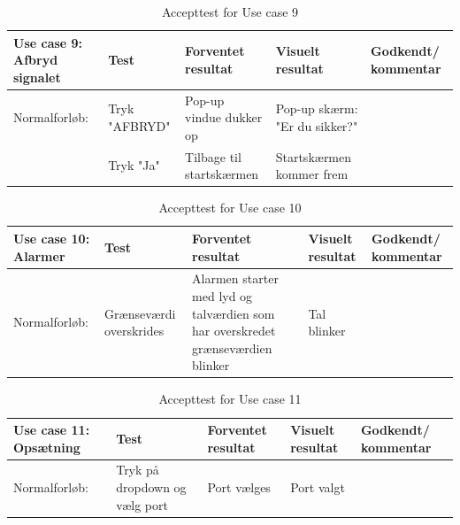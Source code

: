 \begin{table}[h!]
\caption{Accepttest for Use case 9}\label{tab:tabel8}
\begin{tabular}{|>{\raggedright\arraybackslash}p{2.5cm}| >{\raggedright\arraybackslash}p{2.9cm} | >{\raggedright\arraybackslash}p{2.9cm} | >{\raggedright\arraybackslash}p{2.9cm} | >{\raggedright\arraybackslash}p{2.8cm} |}
   \hline
   \textbf{Use case 9: Afbryd signalet } &\textbf{Test}& \textbf{Forventet resultat} & \textbf{Visuelt resultat} & \textbf{Godkendt/ kommentar}\\ \hline
   Normalforløb:& Tryk "AFBRYD" & Pop-up vindue dukker op & Pop-up skærm: "Er du sikker?" &\\\hline
   &Tryk "Ja"&Tilbage til startskærmen& Startskærmen kommer frem&\\\hline
\end{tabular}
\end{table}

\begin{table}[h!]
\caption{Accepttest for Use case 10}\label{tab:tabel8}
\begin{tabular}{|>{\raggedright\arraybackslash}p{2.5cm}| >{\raggedright\arraybackslash}p{2.9cm} | >{\raggedright\arraybackslash}p{2.9cm} | >{\raggedright\arraybackslash}p{2.9cm} | >{\raggedright\arraybackslash}p{2.8cm} |}
   \hline
   \textbf{Use case 10: Alarmer } &\textbf{Test}& \textbf{Forventet resultat} & \textbf{Visuelt resultat} & \textbf{Godkendt/ kommentar}\\ \hline
   Normalforløb:& Grænseværdi overskrides& Alarmen starter med lyd og talværdien som har overskredet grænseværdien blinker & Tal blinker &\\\hline
\end{tabular}
\end{table}

\begin{table}[h!]
\caption{Accepttest for Use case 11}\label{tab:tabel8}
\begin{tabular}{|>{\raggedright\arraybackslash}p{2.5cm}| >{\raggedright\arraybackslash}p{2.9cm} | >{\raggedright\arraybackslash}p{2.9cm} | >{\raggedright\arraybackslash}p{2.9cm} | >{\raggedright\arraybackslash}p{2.8cm} |}
   \hline
   \textbf{Use case 11: Opsætning } &\textbf{Test}& \textbf{Forventet resultat} & \textbf{Visuelt resultat} & \textbf{Godkendt/ kommentar}\\ \hline
   Normalforløb:& Tryk på dropdown og vælg port & Port vælges & Port valgt &\\\hline
\end{tabular}
\end{table}


